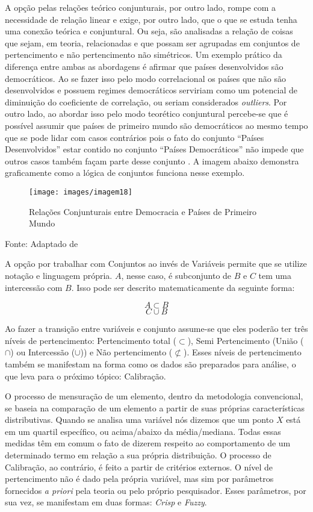 \documentclass[
	12pt,				%
	oneside,			%
	a4paper,			%
	sumario=tradicional,
	english,			%
	brazil				%
	]{abntex2}
\newcommand{\bcenter}{\begin{center}}
\newcommand{\ecenter}{\end{center}}
\begin{document}
A opção pelas relações teórico conjunturais, por outro lado, rompe com a necessidade de relação linear e exige, por outro lado, que o que se estuda tenha uma conexão teórica e conjuntural. Ou seja, são analisadas a relação de coisas que sejam, em teoria, relacionadas e que possam ser agrupadas em conjuntos de pertencimento e não pertencimento não simétricos. Um exemplo prático da diferença entre ambas as abordagens é afirmar que países desenvolvidos são democráticos. Ao se fazer isso pelo modo correlacional os países que não são desenvolvidos e possuem regimes democráticos serviriam como um potencial de diminuição do coeficiente de correlação, ou seriam considerados \emph{outliers}. Por outro lado, ao abordar isso pelo modo teorético conjuntural percebe-se que é possível assumir que países de primeiro mundo são democráticos ao mesmo tempo que se pode lidar com casos contrários pois o fato do conjunto ``Países Desenvolvidos'' estar contido no conjunto ``Países Democráticos'' não impede que outros casos também façam parte desse conjunto \autocite[xxvi-xxvii]{ragin_comparative_1987}. A imagem abaixo demonstra graficamente como a lógica de conjuntos funciona nesse exemplo.
\begin{figure}[H]

{\centering \texttt{[image: images/imagem18]} 

}

\caption{Relações Conjunturais entre Democracia e Países de Primeiro Mundo}\label{fig:imagem18}
\end{figure}
\bcenter

Fonte: Adaptado de \autocite{ragin_redesigning_2008}
\ecenter

A opção por trabalhar com Conjuntos ao invés de Variáveis permite que se utilize notação e linguagem própria. \(A\), nesse caso, é subconjunto de \(B\) e \(C\) tem uma intercessão com \(B\). Isso pode ser descrito matematicamente da seguinte forma:

\[ A \subset B \]
\[  C \cup B \]

Ao fazer a transição entre variáveis e conjunto assume-se que eles poderão ter três níveis de pertencimento: Pertencimento \acrshort{total} (\(\subset\)), \acrshort{Semi} Pertencimento (União (\(\cap\)) \acrshort{ou} Intercessão (\(\cup\))) e Não \acrshort{pertencimento} (\(\not\subset\)). Esses níveis de pertencimento também se manifestam na forma como os dados são preparados para análise, o que leva para o próximo tópico: Calibração.

O processo de mensuração de um elemento, dentro da metodologia convencional, se baseia na comparação de um elemento a partir de suas próprias características distributivas. Quando se analisa uma variável nós dizemos que um ponto \(X\) está em um quartil específico, ou acima/abaixo da média/mediana. Todas essas medidas têm em comum o fato de dizerem respeito ao comportamento de um determinado termo em relação a sua própria distribuição. O processo de Calibração, ao contrário, é feito a partir de critérios externos. O nível de pertencimento não é dado pela própria variável, mas sim por parâmetros fornecidos \emph{a priori} pela teoria ou pelo próprio pesquisador. Esses parâmetros, por sua vez, se manifestam em duas formas: \emph{Crisp} e \emph{Fuzzy}.
\end{document}
